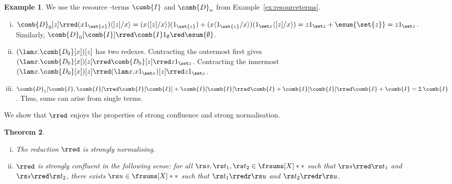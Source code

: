 \documentclass[10pt,a4paper]{amsart}
\newtheorem{theorem}{Theorem}
\theoremstyle{definition}
\newtheorem{example}[theorem]{Example}
\newcommand{\bsub}{\begin{enumerate}[(i)]}
\newcommand{\esub}{\end{enumerate}}
\begin{document}
\begin{example} We use the resource \lamI-terms $\comb{I}$ and $\comb{D}_n$ from Example~\ref{ex:resourceterms}.
\bsub
\item $\comb{D}_0[z]\rred (x1_{\set{x}})\langle[z]/x\rangle = 
	(x\langle[z]/x\rangle)(1_{\set{z}}) + (x\langle1_{\set{z}}/x\rangle)(1_{\set x}\langle [z]/x\rangle) = z1_{\set z}+\esum{\set{z}} = z1_{\set z}$. 
	Similarly, $\comb{D}_0[\comb{I}] \rred \comb{I}1_{\emptyset} 
	\red \esum{\emptyset}$.
\item $(\lam x.\comb{D_0}[x])[z]$ has two redexes. Contracting the outermost first gives $(\lam x.\comb{D_0}[x])[z]\rred \comb{D_0}[z]\rred z1_{\set z}$.
Contracting the innermost $(\lam x.\comb{D_0}[x])[z]\rred (\lam x.x1_{\set x})[z]\rred z1_{\set z}$.
\item $\comb{D}_1[\comb{I},\comb{I}]\rred \comb{I}[\comb{I}] + \comb{I}[\comb{I}]\rred \comb{I}+ \comb{I}[\comb{I}]\rred \comb{I}+\comb{I} = 2.\comb{I}$. 
Thus, sums can arise from single terms.
\esub
\end{example}

We show that $\rred$ enjoys the properties of strong confluence and strong normalisation.

\setcounter{the:rred-norm-confl:confl}{\thetheorem}
\begin{theorem} \label{the:rred-norm-confl}\mbox{}
\bsub
\item The reduction $\rred$ is strongly normalising.
	\label{the:rred-norm-confl:norm}
\item $\rred$ is strongly confluent in the following sense:
	for all $\rs s, \rs t_1, \rs t_2 \in \frsums[X]**$
	such that $\rs s \rred \rs t_1$ and $\rs s \rred \rs t_2$,
	there exists $\rs u \in \frsums[X]**$ such that
	$\rs t_1 \rredr \rs u$ and $\rs t_2 \rredr \rs u$.
	\label{the:rred-norm-confl:confl}
\esub 
\end{theorem}
\end{document}
